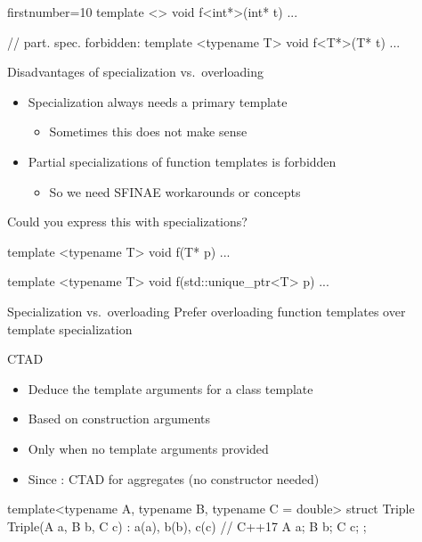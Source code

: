 \begin{advanced}
\begin{frame}[fragile]
\begin{multicols}{2}
\begin{cppcode*}{firstnumber=10}
      template <>
      void f<int*>(int* t) { ... }

      // part. spec. forbidden:
      template <typename T>
      void f<T*>(T* t) {...}
    \end{cppcode*}
  \end{multicols}
\end{frame}

\begin{frame}[fragile]
  \begin{block}{Disadvantages of specialization vs.\ overloading}
    \begin{itemize}
      \item Specialization always needs a primary template
      \begin{itemize}
        \item Sometimes this does not make sense
      \end{itemize}
      \item Partial specializations of function templates is forbidden
      \begin{itemize}
        \item So we need SFINAE workarounds or concepts
      \end{itemize}
    \end{itemize}
  \end{block}
  \small
  \begin{block}{Could you express this with specializations?}
    \begin{cppcode}
      template <typename T>
      void f(T* p) { ... }

      template <typename T>
      void f(std::unique_ptr<T> p) { ... }
    \end{cppcode}
  \end{block}
  \begin{goodpractice}{Specialization vs.\ overloading}
    Prefer overloading function templates over template specialization
  \end{goodpractice}
\end{frame}

\begin{frame}[fragile]
  \begin{block}{CTAD}
    \begin{itemize}
    \item Deduce the template arguments for a class template
    \item Based on construction arguments
    \item Only when no template arguments provided
    \item Since : CTAD for aggregates (no constructor needed)
    \end{itemize}
  \end{block}
  \begin{cppcode*}{}
    template<typename A, typename B, typename C = double>
    struct Triple {
      Triple(A a, B b, C c) : a(a), b(b), c(c) {} // C++17
      A a; B b; C c;
    };


\end{cppcode*}
\end{frame}
\end{advanced}
